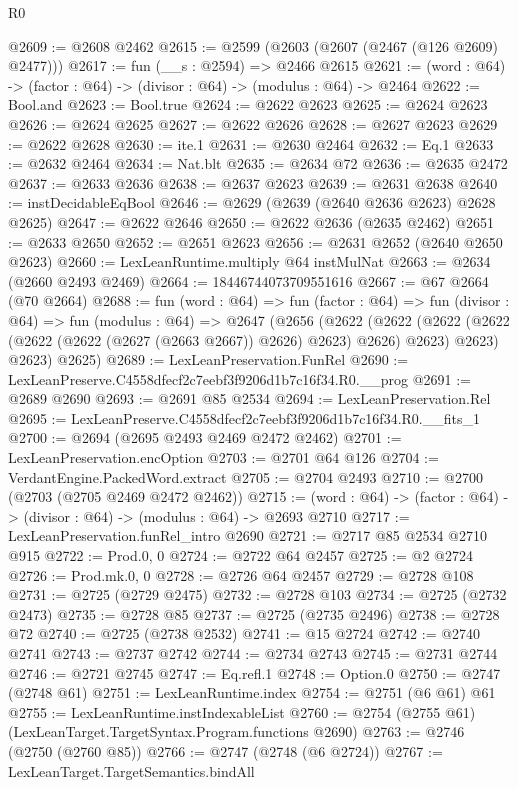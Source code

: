 \begin{lexlean}{R0}
\begin{coremodule}
@2609 := @2608 @2462
@2615 := @2599 (@2603 (@2607 (@2467 (@126 @2609) @2477)))
@2617 := fun (__s : @2594) => @2466 @2615
@2621 := (word : @64) -> (factor : @64) -> (divisor : @64) -> (modulus : @64) -> @2464
@2622 := Bool.and
@2623 := Bool.true
@2624 := @2622 @2623
@2625 := @2624 @2623
@2626 := @2624 @2625
@2627 := @2622 @2626
@2628 := @2627 @2623
@2629 := @2622 @2628
@2630 := ite.{1}
@2631 := @2630 @2464
@2632 := Eq.{1}
@2633 := @2632 @2464
@2634 := Nat.blt
@2635 := @2634 @72
@2636 := @2635 @2472
@2637 := @2633 @2636
@2638 := @2637 @2623
@2639 := @2631 @2638
@2640 := instDecidableEqBool
@2646 := @2629 (@2639 (@2640 @2636 @2623) @2628 @2625)
@2647 := @2622 @2646
@2650 := @2622 @2636 (@2635 @2462)
@2651 := @2633 @2650
@2652 := @2651 @2623
@2656 := @2631 @2652 (@2640 @2650 @2623)
@2660 := LexLeanRuntime.multiply @64 instMulNat
@2663 := @2634 (@2660 @2493 @2469)
@2664 := 18446744073709551616
@2667 := @67 @2664 (@70 @2664)
@2688 := fun (word : @64) =>
  fun (factor : @64) =>
  fun (divisor : @64) =>
  fun (modulus : @64) =>
  @2647
    (@2656
      (@2622
        (@2622 (@2622 (@2622 (@2622 (@2622 (@2627 (@2663 @2667)) @2626) @2623) @2626) @2623) @2623)
        @2623)
      @2625)
@2689 := LexLeanPreservation.FunRel
@2690 := LexLeanPreserve.C4558dfecf2c7eebf3f9206d1b7c16f34.R0.__prog
@2691 := @2689 @2690
@2693 := @2691 @85 @2534
@2694 := LexLeanPreservation.Rel
@2695 := LexLeanPreserve.C4558dfecf2c7eebf3f9206d1b7c16f34.R0.__fits_1
@2700 := @2694 (@2695 @2493 @2469 @2472 @2462)
@2701 := LexLeanPreservation.encOption
@2703 := @2701 @64 @126
@2704 := VerdantEngine.PackedWord.extract
@2705 := @2704 @2493
@2710 := @2700 (@2703 (@2705 @2469 @2472 @2462))
@2715 := (word : @64) -> (factor : @64) -> (divisor : @64) -> (modulus : @64) -> @2693 @2710
@2717 := LexLeanPreservation.funRel_intro @2690
@2721 := @2717 @85 @2534 @2710 @915
@2722 := Prod.{0, 0}
@2724 := @2722 @64 @2457
@2725 := @2 @2724
@2726 := Prod.mk.{0, 0}
@2728 := @2726 @64 @2457
@2729 := @2728 @108
@2731 := @2725 (@2729 @2475)
@2732 := @2728 @103
@2734 := @2725 (@2732 @2473)
@2735 := @2728 @85
@2737 := @2725 (@2735 @2496)
@2738 := @2728 @72
@2740 := @2725 (@2738 @2532)
@2741 := @15 @2724
@2742 := @2740 @2741
@2743 := @2737 @2742
@2744 := @2734 @2743
@2745 := @2731 @2744
@2746 := @2721 @2745
@2747 := Eq.refl.{1}
@2748 := Option.{0}
@2750 := @2747 (@2748 @61)
@2751 := LexLeanRuntime.index
@2754 := @2751 (@6 @61) @61
@2755 := LexLeanRuntime.instIndexableList
@2760 := @2754 (@2755 @61) (LexLeanTarget.TargetSyntax.Program.functions @2690)
@2763 := @2746 (@2750 (@2760 @85))
@2766 := @2747 (@2748 (@6 @2724))
@2767 := LexLeanTarget.TargetSemantics.bindAll

\end{coremodule}
\end{lexlean}
